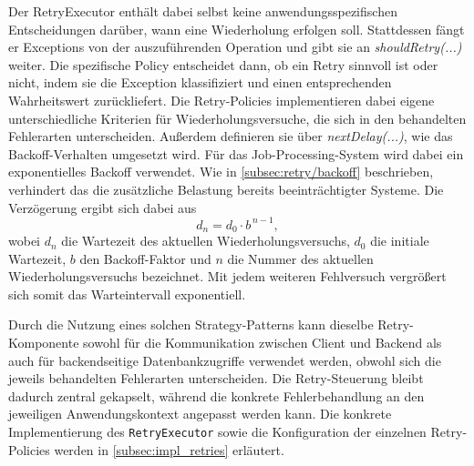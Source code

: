 Der RetryExecutor enthält dabei selbst keine anwendungsspezifischen Entscheidungen darüber, wann eine Wiederholung erfolgen soll.
Stattdessen fängt er Exceptions von der auszuführenden Operation und gibt sie an \textit{shouldRetry(...)} weiter.
Die spezifische Policy entscheidet dann, ob ein Retry sinnvoll ist oder nicht, indem sie die Exception klassifiziert und einen
entsprechenden Wahrheitswert zurückliefert.
Die Retry-Policies implementieren dabei eigene unterschiedliche Kriterien für Wiederholungsversuche, die sich in den behandelten
Fehlerarten unterscheiden.
Außerdem definieren sie über \textit{nextDelay(...)}, wie das Backoff-Verhalten umgesetzt wird.
Für das Job-Processing-System wird dabei ein exponentielles Backoff verwendet.
Wie in \cref{subsec:retry/backoff} beschrieben, verhindert das die zusätzliche Belastung bereits beeinträchtigter Systeme.
Die Verzögerung ergibt sich dabei aus
\[
    d_n = d_0 \cdot b^{\,n-1},
\]
wobei $d_n$ die Wartezeit des aktuellen Wiederholungsversuchs, $d_0$ die initiale Wartezeit, $b$ den Backoff-Faktor und
$n$ die Nummer des aktuellen Wiederholungsversuchs bezeichnet.
Mit jedem weiteren Fehlversuch vergrößert sich somit das Warteintervall exponentiell.

Durch die Nutzung eines solchen Strategy-Patterns kann dieselbe Retry-Komponente sowohl für die Kommunikation zwischen
Client und Backend als auch für backendseitige Datenbankzugriffe verwendet werden, obwohl sich die jeweils
behandelten Fehlerarten unterscheiden.
Die Retry-Steuerung bleibt dadurch zentral gekapselt, während die konkrete Fehlerbehandlung an den jeweiligen
Anwendungskontext angepasst werden kann.
Die konkrete Implementierung des \texttt{RetryExecutor} sowie die Konfiguration der einzelnen Retry-Policies werden in
\cref{subsec:impl_retries} erläutert.

